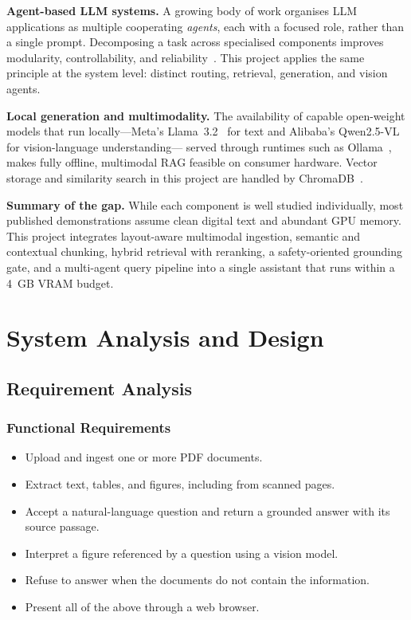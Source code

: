 \documentclass[12pt,a4paper]{report}
\begin{document}
\textbf{Agent-based LLM systems.} A growing body of work organises LLM
applications as multiple cooperating \emph{agents}, each with a focused role,
rather than a single prompt. Decomposing a task across specialised components
improves modularity, controllability, and reliability~\cite{ref:react}. This
project applies the same principle at the system level: distinct routing,
retrieval, generation, and vision agents.

\textbf{Local generation and multimodality.} The availability of capable
open-weight models that run locally---Meta's Llama~3.2~\cite{ref:llama} for text
and Alibaba's Qwen2.5-VL~\cite{ref:qwenvl} for vision-language understanding---
served through runtimes such as Ollama~\cite{ref:ollama}, makes fully offline,
multimodal RAG feasible on consumer hardware. Vector storage and similarity search
in this project are handled by ChromaDB~\cite{ref:chroma}.

\textbf{Summary of the gap.} While each component is well studied individually,
most published demonstrations assume clean digital text and abundant GPU memory.
This project integrates layout-aware multimodal ingestion, semantic and contextual
chunking, hybrid retrieval with reranking, a safety-oriented grounding gate, and a
multi-agent query pipeline into a single assistant that runs within a 4~GB VRAM
budget.

\chapter{System Analysis and Design}

\section{Requirement Analysis}
\subsection{Functional Requirements}
\begin{itemize}[leftmargin=1.4em]
  \item Upload and ingest one or more PDF documents.
  \item Extract text, tables, and figures, including from scanned pages.
  \item Accept a natural-language question and return a grounded answer with its
        source passage.
  \item Interpret a figure referenced by a question using a vision model.
  \item Refuse to answer when the documents do not contain the information.
  \item Present all of the above through a web browser.
\end{itemize}
\end{document}
